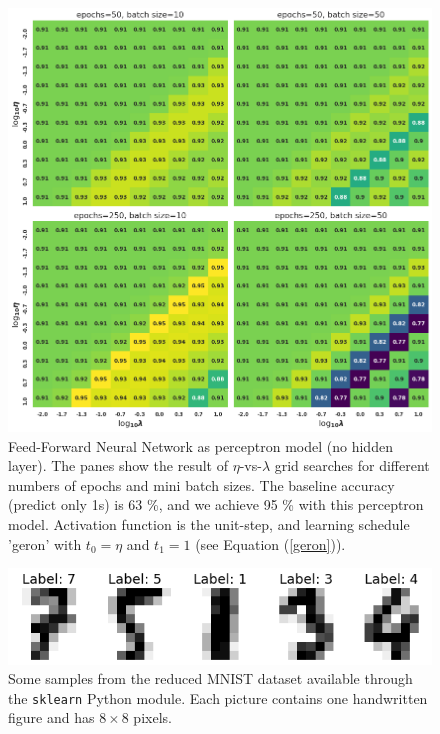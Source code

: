 \documentclass[]{article}
\begin{document}
\begin{figure}[!htb]
	\centering
	\includegraphics[width=1\linewidth]{ffnn_breast_cancer.png}
	\caption{Feed-Forward Neural Network as perceptron model (no hidden layer). The panes show the result of $\eta$-vs-$\lambda$ grid searches for different numbers of epochs and mini batch sizes. The baseline accuracy (predict only 1s) is 63 \%, and we achieve 95 \% with this perceptron model. Activation function is the unit-step, and learning schedule 'geron' with $t_0 = \eta$ and $t_1 = 1$ (see Equation (\ref{geron})).}
	\label{fig:ffnn_breast_cancer}
\end{figure}


\begin{figure}[!htb]
	\centering
	\includegraphics[width=1\linewidth]{mnist_digits.png}
	\caption{Some samples from the reduced MNIST dataset available through the \lstinline|sklearn| Python module. Each picture contains one handwritten figure and has $8 \times 8$ pixels.}
	\label{fig:mnist_digits}
\end{figure}
\end{document}

